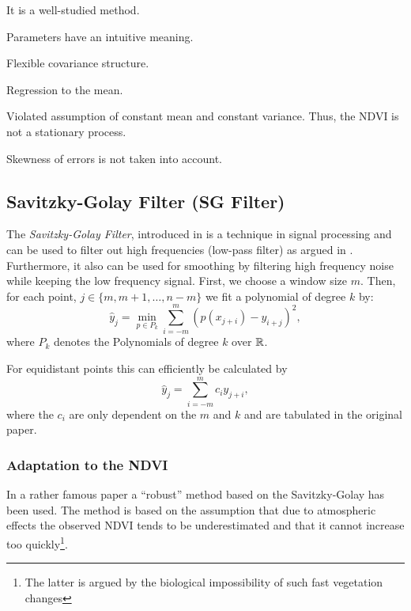 \begin{my_pros_cons_table}{
		\item It is a well-studied method.
		\item Parameters have an intuitive meaning.
		\item Flexible covariance structure.
	}{
		\item Regression to the mean.
		\item Violated assumption of constant mean and constant variance. Thus, the NDVI is not a stationary process.
		\item Skewness of errors is not taken into account.
	}
\end{my_pros_cons_table}


\subsection{Savitzky-Golay Filter (SG Filter)}
\label{sec:Savitzky–Golay}
The \textit{Savitzky-Golay Filter}, introduced in \cite{savitzkySmoothingDifferentiationData1964} is a technique in signal processing and can be used to filter out high frequencies (low-pass filter) as argued in \cite{schaferWhatSavitzkyGolayFilter2011}. Furthermore, it also can be used for smoothing by filtering high frequency noise while keeping the low frequency signal.
First, we choose a window size $m$. Then, for each point, $j \in \{m, m+1, \dots, n-m\}$ we fit a polynomial of degree $k$ by:
$$\hat y_j=\min_{p\in P_k}\sum_{i=-m}^{m}(p (x_{j+i})-y_{i+j})^{2},$$
where $P_k$ denotes the Polynomials of degree $k$ over $\mathbb{R}$.

For equidistant points this can efficiently be calculated by
$$
	\hat y_{j}=\sum_{i=-m}^{m} c_{i} y_{j+i},
$$
where the $c_i$ are only dependent on the $m$ and $k$ and are tabulated in the original paper.

\subsubsection*{Adaptation to the NDVI}
In a rather famous paper \cite{chenSimpleMethodReconstructing2004a} a ``robust'' method based on the Savitzky-Golay has been used.
The method is based on the assumption that due to atmospheric effects the observed NDVI tends to be underestimated and that it cannot increase too quickly\footnote{The latter is argued by the biological impossibility of such fast vegetation changes}.

